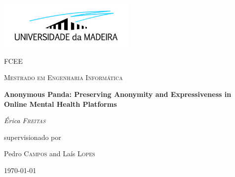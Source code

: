 \begin{titlepage}
\centering
\addtolength{\hoffset}{0cm}
    \centering
	\includegraphics[width=0.50\textwidth]{figures/logoUMa.jpg}\par\vspace{1cm}
	{\scshape\LARGE FCEE \par}
	\vspace{1cm}
	{\scshape\Large Mestrado em Engenharia Informática \par}
	\vspace{1.5cm}
	{\huge\bfseries Anonymous Panda: Preserving Anonymity and Expressiveness in Online Mental Health Platforms \par}
	\vspace{2cm}
	{\Large\itshape Érica \textsc{Freitas}\par}
	\vfill
	supervisionado por \par
	Pedro \textsc{Campos} and Laís \textsc{Lopes}

	\vfill

	{\large {}\today\par}
\end{titlepage}